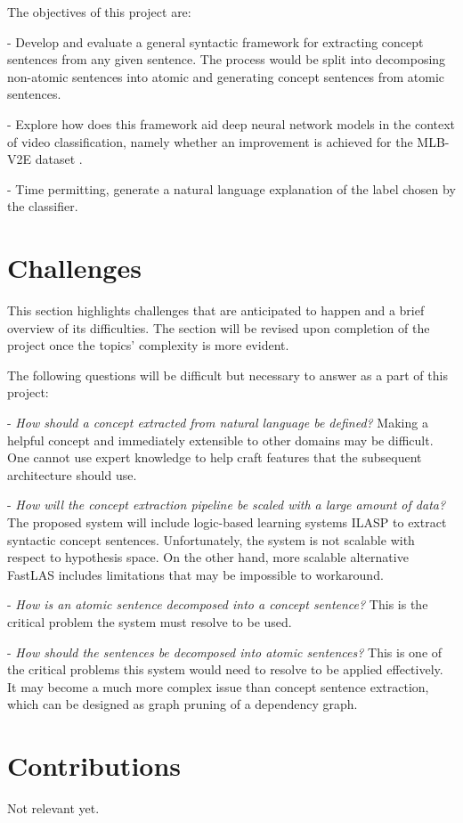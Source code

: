 The objectives of this project are:

 - Develop and evaluate a general syntactic framework for extracting concept sentences from any given sentence. The process would be split into decomposing non-atomic sentences into atomic and generating concept sentences from atomic sentences.
 
 - Explore how does this framework aid deep neural network models in the context of video classification, namely whether an improvement is achieved for the MLB-V2E dataset \cite{RefWorks:RefID:16-2021automatic}.


 - Time permitting, generate a natural language explanation of the label chosen by the classifier. 


\section{Challenges}

This section highlights challenges that are anticipated to happen and a brief overview of its difficulties.
The section will be revised upon completion of the project once the topics' complexity is more evident.

The following questions will be difficult but necessary to answer as a part of this project:

 - \emph{How should a concept extracted from natural language be defined?} Making a helpful concept and immediately extensible to other domains may be difficult. One cannot use expert knowledge to help craft features that the subsequent architecture should use.
 
 
 - \emph{How will the concept extraction pipeline be scaled with a large amount of data?} The proposed system will include logic-based learning systems ILASP \cite{RefWorks:RefID:18-law2020ilasp} to extract syntactic concept sentences. 
 Unfortunately, the system is not scalable with respect to hypothesis space. On the other hand, more scalable alternative FastLAS \cite{RefWorks:RefID:19-law2020fastlas:} includes limitations that may be impossible to workaround.
 
 - \emph{How is an atomic sentence decomposed into a concept sentence?} This is the critical problem the system must resolve to be used.

 - \emph{How should the sentences be decomposed into atomic sentences?} This is one of the critical problems this system would need to resolve to be applied effectively. It may become a much more complex issue than concept sentence extraction, which can be designed as graph pruning of a dependency graph.
 


\section{Contributions}

Not relevant yet.


